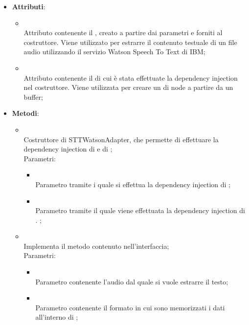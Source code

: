 \begin{itemize}
\begin{itemize}
\end{itemize};
	\item \textbf{Attributi}:
	\begin{itemize}
		\item[]  \\
		Attributo contenente il , creato a partire dai parametri  e  forniti al costruttore. Viene utilizzato per estrarre il contenuto testuale di un file audio utilizzando il servizio Watson Speech To Text di IBM;
		\item[]  \\
		Attributo contenente il  di cui è stata effettuate la dependency injection nel costruttore. Viene utilizzata per creare un  di node a partire da un buffer;
	\end{itemize}
	\item \textbf{Metodi}:
	\begin{itemize}
		\item[]  \\
		Costruttore di STTWatsonAdapter, che permette di effettuare la dependency injection di  e di ;\\
		Parametri:
		\begin{itemize}
			\item {} \\
			Parametro tramite i quale si effettua la dependency injection di ;
			\item {} \\
			Parametro tramite il quale viene effettuata la dependency injection di . ;
		\end{itemize}
		\item[]  \\
			Implementa il metodo  contenuto nell'interfaccia;\\
		Parametri:
		\begin{itemize}
			\item {} \\
			Parametro contenente l'audio dal quale si vuole estrarre il testo;
			\item {} \\
			Parametro contenente il formato in cui sono memorizzati i dati all'interno di ;
		\end{itemize}
	\end{itemize}
\end{itemize}

